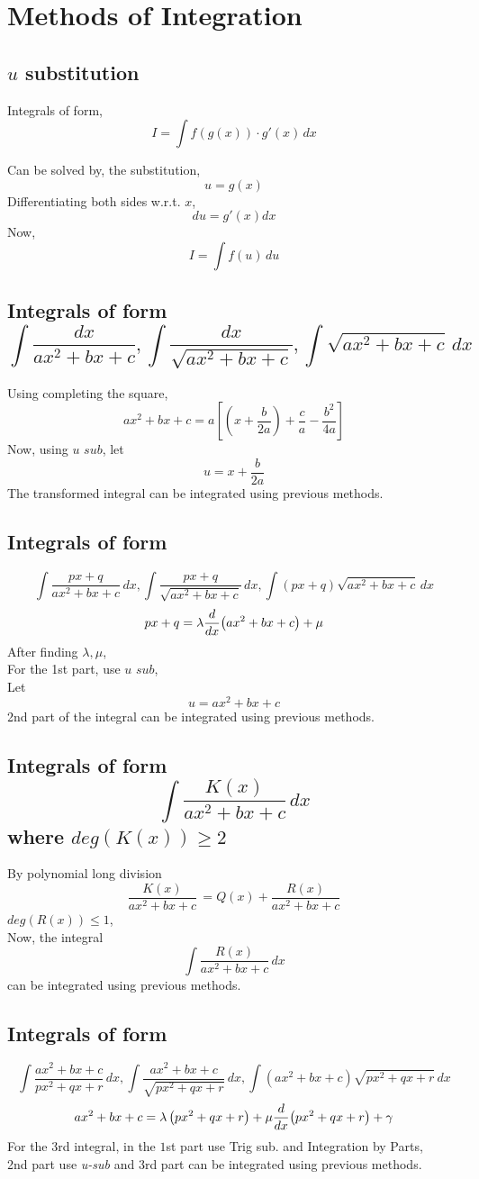 \documentclass{article}
\begin{document}
\section{Methods of Integration}
\subsection{$u$ substitution}
Integrals of form, $$I=\int f(g(x))\cdot g'(x) \, dx$$

Can be solved by, the substitution,
$$u=g(x)$$ Differentiating both sides w.r.t. $x$,
$$du=g'(x)dx$$
Now, $$I=\int f(u) \, du$$
\subsection{Integrals of form $$\int \dfrac{dx}{ax^2+bx+c}, \int \dfrac{dx}{\sqrt{ax^2+bx+c}}, \int \sqrt{ax^2+bx+c} \, dx$$}
Using completing the square, $$ax^2+bx+c=a \left[\left(x+\dfrac{b}{2a}\right)+\dfrac{c}{a}-\dfrac{b^2}{4a}\right]$$
Now, using $\textit{u sub}$, let $$u=x+\dfrac{b}{2a}$$
The transformed integral can be integrated using previous methods.

\subsection{Integrals of form}
$$\int \dfrac{px+q}{ax^2+bx+c} \, dx, \int \dfrac{px+q}{\sqrt{ax^2+bx+c}} \, dx, \int \left(px+q\right)\sqrt{ax^2+bx+c} \, dx $$
$$px+q=\lambda \dv{x}(ax^2+bx+c) +\mu$$
After finding $\lambda,  \mu$, \\For the 1st part, use $\textit{u sub}$,\\ Let $$u= ax^2+bx+c$$
2nd part of the integral can be integrated using previous methods.
\subsection{Integrals of form $$\int \dfrac{K(x)}{ax^2+bx+c} \, dx$$ where $deg(K(x))\ge2$}

By polynomial long division $$\dfrac{K(x)}{ax^2+bx+c} \,=Q(x) + \dfrac{R(x)}{ax^2+bx+c}$$
$deg(R(x))\le 1$,
\\ Now, the integral $$\int \dfrac{R(x)}{ax^2+bx+c} \, dx$$
can be integrated using previous methods.

\subsection{Integrals of form}
$$\int \dfrac{ax^2+bx+c}{px^2+qx+r} \, dx, \int \dfrac{ax^2+bx+c}{\sqrt{px^2+qx+r}} \, dx, \int \left(ax^2+bx+c\right)\sqrt{px^2+qx+r} \, dx$$
$$ax^2+bx+c= \lambda \left(px^2+qx+r\right)+\mu \dv{x}(px^2+qx+r)+\gamma$$
For the 3rd integral, in the $1$st part use Trig sub. and  Integration by Parts, \\ 2nd part use \textit{u-sub} and 3rd part can be integrated using previous methods.
\end{document}

